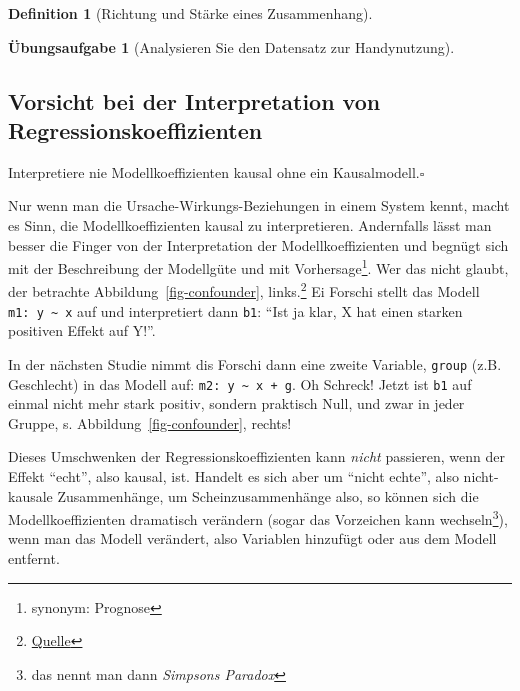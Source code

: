 \documentclass[
  a4paper,
  DIV=11]{scrreprt}
\theoremstyle{definition}
\newtheorem{exercise}{Übungsaufgabe}[chapter]
\theoremstyle{definition}
\theoremstyle{definition}
\newtheorem{definition}{Definition}[chapter]
\theoremstyle{remark}
\begin{document}
\begin{definition}[Richtung und Stärke eines
Zusammenhang]
\begin{exercise}[Analysieren Sie den Datensatz zur
Handynutzung]
\subsection{Vorsicht bei der Interpretation von
Regressionskoeffizienten}\label{vorsicht-bei-der-interpretation-von-regressionskoeffizienten}

\begin{tcolorbox}[enhanced jigsaw, leftrule=.75mm, opacitybacktitle=0.6, colback=white, colframe=quarto-callout-important-color-frame, coltitle=black, colbacktitle=quarto-callout-important-color!10!white, opacityback=0, left=2mm, breakable, titlerule=0mm, toptitle=1mm, bottomtitle=1mm, rightrule=.15mm, title=\textcolor{quarto-callout-important-color}{\faExclamation}\hspace{0.5em}{Wichtig}, arc=.35mm, bottomrule=.15mm, toprule=.15mm]

Interpretiere nie Modellkoeffizienten kausal ohne ein
Kausalmodell.\(\square\)

\end{tcolorbox}

Nur wenn man die Ursache-Wirkungs-Beziehungen in einem System kennt,
macht es Sinn, die Modellkoeffizienten kausal zu interpretieren.
Andernfalls lässt man besser die Finger von der Interpretation der
Modellkoeffizienten und begnügt sich mit der Beschreibung der Modellgüte
und mit Vorhersage\footnote{synonym: Prognose}. Wer das nicht glaubt,
der betrachte Abbildung~\ref{fig-confounder}, links.\footnote{\href{https://data-se.netlify.app/2021/12/01/simulation-on-controlling-confounders/}{Quelle}}
Ei Forschi stellt das Modell \texttt{m1:\ y\ \textasciitilde{}\ x} auf
und interpretiert dann \texttt{b1}: ``Ist ja klar, X hat einen starken
positiven Effekt auf Y!''.

In der nächsten Studie nimmt dis Forschi dann eine zweite Variable,
\texttt{group} (z.B. Geschlecht) in das Modell auf:
\texttt{m2:\ y\ \textasciitilde{}\ x\ +\ g}. Oh Schreck! Jetzt ist
\texttt{b1} auf einmal nicht mehr stark positiv, sondern praktisch Null,
und zwar in jeder Gruppe, s. Abbildung~\ref{fig-confounder}, rechts!

Dieses Umschwenken der Regressionskoeffizienten kann \emph{nicht}
passieren, wenn der Effekt ``echt'', also kausal, ist. Handelt es sich
aber um ``nicht echte'', also nicht-kausale Zusammenhänge, um
Scheinzusammenhänge also, so können sich die Modellkoeffizienten
dramatisch verändern (sogar das Vorzeichen kann wechseln\footnote{das
  nennt man dann \emph{Simpsons Paradox}}), wenn man das Modell
verändert, also Variablen hinzufügt oder aus dem Modell entfernt.


\end{exercise}
\end{definition}
\end{document}
